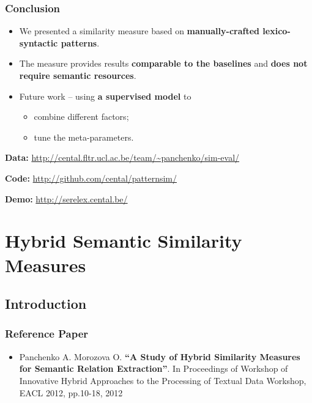 \documentclass{beamer}
\begin{document}
\begin{frame}
\frametitle{Conclusion}

\begin{itemize}
  \item We presented a similarity measure based on \textbf{manually-crafted lexico-syntactic patterns}.
 

\item The measure provides results \textbf{comparable to the baselines} and \textbf{does not require semantic resources}.

\item Future work -- using \textbf{a supervised model} to
\begin{itemize}
\item combine different factors;
\item tune the meta-parameters.
\end{itemize}
    
\end{itemize}

\textbf{Data:} {\footnotesize \url{http://cental.fltr.ucl.ac.be/team/~panchenko/sim-eval/ } }

\textbf{Code:} {\footnotesize \url{http://github.com/cental/patternsim/}}

\textbf{Demo:} {\footnotesize \url{http://serelex.cental.be/}}


\end{frame}



\section{Hybrid Semantic Similarity Measures}

\subsection{Introduction}



\begin{frame}
\frametitle{Reference Paper}

\begin{itemize}

\item Panchenko A. Morozova O. \textbf{“A Study of Hybrid Similarity Measures for Semantic Relation Extraction”}. In Proceedings of Workshop of Innovative Hybrid Approaches to the Processing of Textual Data Workshop, EACL 2012, pp.10-18, 2012
\end{itemize}

\end{frame}
\end{document}
